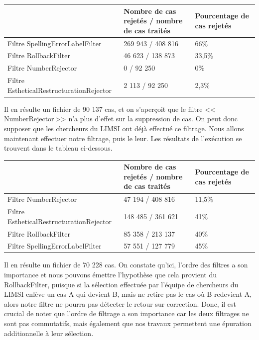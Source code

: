 \documentclass[11pt]{article}
\begin{document}
\begin{center}
\begin{tabular}{|M{6cm}|M{5cm}|M{6cm}|}
   \hline
    \, &Nombre de cas rejet\'{e}s / nombre de cas trait\'{e}s & Pourcentage de cas rejet\'{e}s \tabularnewline
    \hline
    Filtre SpellingErrorLabelFilter & 269 943 / 408 816 & 66\% \tabularnewline
   \hline
       Filtre RollbackFilter & 46 623 / 138 873 & 33,5\% \tabularnewline
 \hline
    Filtre NumberRejector & 0 / 92 250 & 0\% \tabularnewline
\hline
Filtre EstheticalRestructurationRejector & 2 113 / 92 250 & 2,3\% \tabularnewline
\hline
\end{tabular}
\end{center}

Il en r\'{e}sulte un fichier de 90 137 cas, et on s'aper\c{c}oit que le filtre <<\,NumberRejector\,>> n'a plus d'effet sur la suppression de cas. On peut donc supposer que les chercheurs du LIMSI ont d\'{e}j\`{a} effectu\'{e} ce filtrage.
\newline
\newline
Nous allons maintenant effectuer notre filtrage, puis le leur.
Les r\'{e}sultats de l'ex\'{e}cution se trouvent dans le tableau ci-dessous.

\begin{center}
\begin{tabular}{|M{6cm}|M{5cm}|M{6cm}|}
   \hline
    \, &Nombre de cas rejet\'{e}s / nombre de cas trait\'{e}s & Pourcentage de cas rejet\'{e}s \tabularnewline
    \hline
     Filtre NumberRejector & 47 194 / 408 816 & 11,5\% \tabularnewline
\hline
Filtre EstheticalRestructurationRejector & 148 485 / 361 621 & 41\% \tabularnewline
\hline
Filtre RollbackFilter & 85 358 / 213 137 & 40\% \tabularnewline
 \hline
    Filtre SpellingErrorLabelFilter & 57 551 / 127 779 & 45\% \tabularnewline
   \hline
   \end{tabular}
\end{center}
Il en r\'{e}sulte un fichier de 70 228 cas.
\newline
On constate qu'ici, l'ordre des filtres a son importance et nous pouvons \'{e}mettre l'hypoth\`{e}se que cela provient du RollbackFilter, puisque si la s\'{e}lection effectu\'{e}e par l'\'{e}quipe de chercheurs du LIMSI enl\`{e}ve un cas A qui devient B, mais ne retire pas le cas o\`{u} B redevient A, alors notre filtre ne pourra pas d\'{e}tecter le retour sur correction.
Donc, il est crucial de noter que l'ordre de filtrage a son importance car les deux filtrages ne sont pas commutatifs, mais \'{e}galement que nos travaux permettent une \'{e}puration additionnelle \`{a} leur s\'{e}lection.
\end{document}

